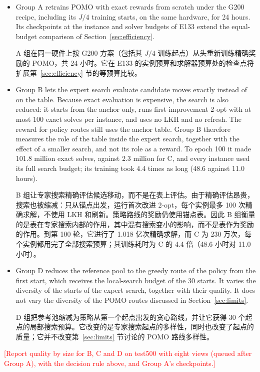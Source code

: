 \documentclass[preprint,12pt,authoryear]{elsarticle}
\newcommand{\placeholder}[1]{\textcolor{red}{[#1]}}
\newcommand{\zh}[1]{\par\vspace{2pt}{\color{zhc}\small #1\par}\vspace{6pt}}
\newcommand{\zhitem}[1]{\par{\color{zhc}#1}}
\begin{document}
\begin{itemize}
\item Group A retrains POMO with exact rewards from scratch under the G200 recipe, including its $J/4$ training starts, on the same hardware, for 24 hours. Its checkpoints at the instance and solver budgets of E133 extend the equal-budget comparison of Section~\ref{sec:efficiency}. \zhitem{A 组在同一硬件上按 G200 方案（包括其 $J/4$ 训练起点）从头重新训练精确奖励的 POMO，共 24 小时。它在 E133 的实例预算和求解器预算处的检查点将扩展第~\ref{sec:efficiency} 节的等预算比较。}
\item Group B lets the expert search evaluate candidate moves exactly instead of on the table. Because exact evaluation is expensive, the search is also reduced: it starts from the anchor only, runs first-improvement 2-opt with at most 100 exact solves per instance, and uses no LKH and no refresh. The reward for policy routes still uses the anchor table. Group B therefore measures the role of the table inside the expert search, together with the effect of a smaller search, and not its role as a reward. To epoch 100 it made 101.8 million exact solves, against 2.3 million for C, and every instance used its full search budget; its training took 4.4 times as long (48.6 against 11.0 hours). \zhitem{B 组让专家搜索精确评估候选移动，而不是在表上评估。由于精确评估昂贵，搜索也被缩减：只从锚点出发，运行首次改进 2-opt，每个实例最多 100 次精确求解，不使用 LKH 和刷新。策略路线的奖励仍使用锚点表。因此 B 组衡量的是表在专家搜索内部的作用，其中混有搜索变小的影响，而不是表作为奖励的作用。到第 100 轮，它进行了 1.018 亿次精确求解，而 C 为 230 万次，每个实例都用完了全部搜索预算；其训练耗时为 C 的 4.4 倍（48.6 小时对 11.0 小时）。}
\item Group D reduces the reference pool to the greedy route of the policy from the first start, which receives the local-search budget of the 30 starts. It varies the diversity of the starts of the expert search, together with their quality. It does not vary the diversity of the POMO routes discussed in Section~\ref{sec:limits}. \zhitem{D 组把参考池缩减为策略从第一个起点出发的贪心路线，并让它获得 30 个起点的局部搜索预算。它改变的是专家搜索起点的多样性，同时也改变了起点的质量；它并不改变第~\ref{sec:limits} 节讨论的 POMO 路线多样性。}
\end{itemize}
\placeholder{Report quality by size for B, C and D on test500 with eight views (queued after Group A), with the decision rule above, and Group A's checkpoints.}

\zh{\placeholder{待 A 组完成后，按上述判定规则报告 B、C、D 在八视角 test500 上按规模的质量，以及 A 组的检查点。}}
\end{document}
